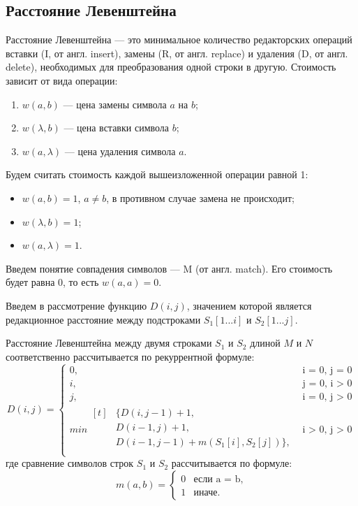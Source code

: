 \subsection{Расстояние Левенштейна}
Расстояние Левенштейна --- это минимальное количество редакторских операций вставки (I, от англ. insert), замены (R, от англ. replace) и удаления (D, от англ. delete), необходимых для преобразования одной строки в другую.
Стоимость зависит от вида операции:
\begin{enumerate}[label=\arabic*)]
	\item $w(a, b)$ --- цена замены символа $a$ на $b$;
	\item $w(\lambda, b)$ --- цена вставки символа $b$;
	\item $w(a, \lambda)$ --- цена удаления символа $a$.
\end{enumerate}

Будем считать стоимость каждой вышеизложенной операции равной 1:
\begin{itemize}[label=---]
	\item $w(a, b) = 1$, $a \neq b$, в противном случае замена не происходит;
	\item $w(\lambda, b) = 1$;
	\item $w(a, \lambda) = 1$.
\end{itemize}

Введем понятие совпадения символов --- M (от англ. match). Его стоимость будет равна 0, то есть $w(a, a) = 0$.

Введем в рассмотрение функцию $D(i, j)$, значением которой является
редакционное расстояние между подстроками $S_1[1...i]$ и $S_2[1...j]$.

Расстояние Левенштейна между двумя строками $S_{1}$ и $S_{2}$ длиной $M$ и $N$ соответственно рассчитывается по рекуррентной формуле:
\begin{equation}
	\label{eq:L}
	D(i, j) =
	\begin{cases}
		0, &\text{i = 0, j = 0}\\
		i, &\text{j = 0, i > 0}\\
		j, &\text{i = 0, j > 0}\\
		min\!\begin{aligned}[t]&\{ D(i, j - 1) + 1,\\ &D(i - 1, j) + 1,\\ &D(i - 1, j - 1) +  m(S_{1}[i], S_{2}[j])\},\\
		\end{aligned} &\text{i > 0, j > 0}
	\end{cases}
\end{equation}
где сравнение символов строк $S_1$ и $S_2$ рассчитывается по формуле:
\begin{equation}
	\label{eq:m}
	m(a, b) = \begin{cases}
		0 &\text{если a = b,}\\
		1 &\text{иначе.}
	\end{cases}
\end{equation}


